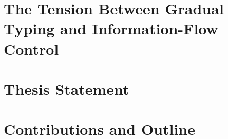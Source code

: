 \section{The Tension Between Gradual Typing and Information-Flow Control}

\section{Thesis Statement}

\section{Contributions and Outline}
